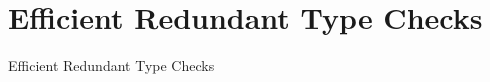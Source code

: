 \section{Efficient Redundant Type Checks}

\begin{frame}{Efficient Redundant Type Checks}
\end{frame}


\newsavebox\typecaseAbox
\begin{lrbox}{\typecaseAbox}
  \begin{minipage}{8cm}
    
  \end{minipage}
\end{lrbox}

\newsavebox\typecaseITEbox
\begin{lrbox}{\typecaseITEbox}
  \begin{minipage}{8cm}
    
  \end{minipage}
\end{lrbox}

\newsavebox\typecaseITEafterbox
\begin{lrbox}{\typecaseITEafterbox}
  \begin{minipage}{8cm}

  \end{minipage}
\end{lrbox}

\newsavebox\typecaseBabox
\begin{lrbox}{\typecaseBabox}
  \begin{minipage}{8cm}

  \end{minipage}
\end{lrbox}

\newsavebox\typecaseBbox
\begin{lrbox}{\typecaseBbox}
  \begin{minipage}{8cm}
    
  \end{minipage}
\end{lrbox}


\newsavebox\typecaseCbox
\begin{lrbox}{\typecaseCbox}
  \begin{minipage}{6cm}

  \end{minipage}
\end{lrbox}

\newsavebox\typecaseChbox
\begin{lrbox}{\typecaseChbox}
  \begin{minipage}{6cm}

  \end{minipage}
\end{lrbox}

